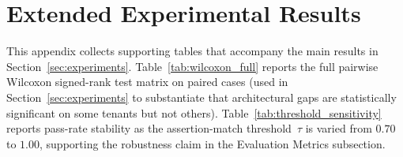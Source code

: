 
\appendix
\begingroup
\color{blue}
\section{Extended Experimental Results}
\label{app:extra_results}

This appendix collects supporting tables that accompany the main results in
Section~\ref{sec:experiments}. Table~\ref{tab:wilcoxon_full} reports the full
pairwise Wilcoxon signed-rank test matrix on paired cases (used in
Section~\ref{sec:experiments} to substantiate that architectural gaps are
statistically significant on some tenants but not others).
Table~\ref{tab:threshold_sensitivity} reports pass-rate stability as the
assertion-match threshold~$\tau$ is varied from $0.70$ to $1.00$, supporting
the robustness claim in the Evaluation Metrics subsection.

